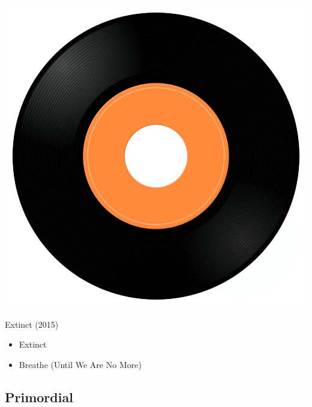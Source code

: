 \begin{minipage}[t]{0.25\textwidth}\vspace{0pt}
\captionsetup{type=figure}
\includegraphics[width=\textwidth]{Images/cover.png}
\caption*{Extinct (2015)}
\end{minipage}
\begin{minipage}[t]{0.25\textwidth}\vspace{0pt}
\begin{itemize}[nosep,leftmargin=1em,labelwidth=*,align=left]
	\setlength{\itemsep}{0pt}
	\item Extinct
	\item Breathe (Until We Are No More)
\end{itemize}
\end{minipage}

\subsection{Primordial}

